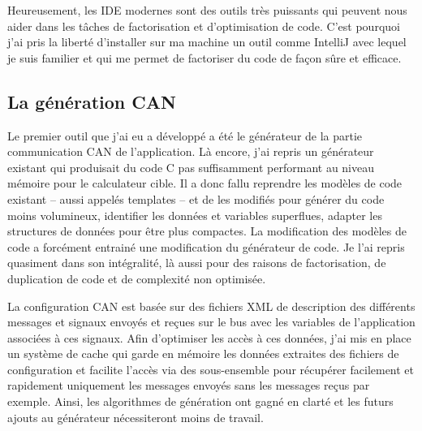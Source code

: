 Heureusement, les IDE modernes sont des outils très puissants qui peuvent nous aider dans les tâches de factorisation et d'optimisation de code. C'est pourquoi j'ai pris la liberté d'installer sur ma machine un outil comme IntelliJ avec lequel je suis familier et qui me permet de factoriser du code de façon sûre et efficace.

\subsection{La génération CAN}
Le premier outil que j'ai eu a développé a été le générateur de la partie communication CAN de l'application. Là encore, j'ai repris un générateur existant qui produisait du code C pas suffisamment performant au niveau mémoire pour le calculateur cible. Il a donc fallu reprendre les modèles de code existant -- aussi appelés \og templates \fg{} -- et de les modifiés pour générer du code moins volumineux, identifier les données et variables superflues, adapter les structures de données pour être plus compactes. La modification des modèles de code a forcément entrainé une modification du générateur de code. Je l'ai repris quasiment dans son intégralité, là aussi pour des raisons de factorisation, de duplication de code et de complexité non optimisée.

La configuration CAN est basée sur des fichiers XML de description des différents messages et signaux envoyés et reçues sur le bus avec les variables de l'application associées à ces signaux. Afin d'optimiser les accès à ces données, j'ai mis en place un système de cache qui garde en mémoire les données extraites des fichiers de configuration et facilite l'accès via des sous-ensemble pour récupérer facilement et rapidement uniquement les messages envoyés sans les messages reçus par exemple. Ainsi, les algorithmes de génération ont gagné en clarté et les futurs ajouts au générateur nécessiteront moins de travail.

